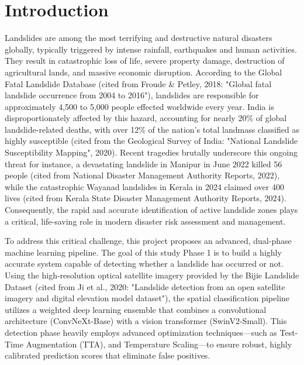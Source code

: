 \documentclass[11pt,a4paper]{article}
\begin{document}
\section{Introduction}
Landslides are among the most terrifying and destructive natural disasters globally, typically triggered by intense rainfall, earthquakes and human activities. They result in catastrophic loss of life, severe property damage, destruction of agricultural lands, and massive economic disruption. According to the Global Fatal Landslide Database (cited from Froude \& Petley, 2018: "Global fatal landslide occurrence from 2004 to 2016"), landslides are responsible for approximately 4,500 to 5,000 people effected worldwide every year. India is disproportionately affected by this hazard, accounting for nearly 20\% of global landslide-related deaths, with over 12\% of the nation's total landmass classified as highly susceptible (cited from the Geological Survey of India: "National Landslide Susceptibility Mapping", 2020). Recent tragedies brutally underscore this ongoing threat for instance, a devastating landslide in Manipur in June 2022 killed 56 people (cited from National Disaster Management Authority Reports, 2022), while the catastrophic Wayanad landslides in Kerala in 2024 claimed over 400 lives (cited from Kerala State Disaster Management Authority Reports, 2024). Consequently, the rapid and accurate identification of active landslide zones plays a critical, life-saving role in modern disaster risk assessment and management.

To address this critical challenge, this project proposes an advanced, dual-phase machine learning pipeline. The goal of this study Phase 1 is to build a highly accurate system capable of detecting whether a landslide has occurred or not. Using the high-resolution optical satellite imagery provided by the Bijie Landslide Dataset (cited from Ji et al., 2020: "Landslide detection from an open satellite imagery and digital elevation model dataset"), the spatial classification pipeline utilizes a weighted deep learning ensemble that combines a convolutional architecture (ConvNeXt-Base) with a vision transformer (SwinV2-Small). This detection phase heavily employs advanced optimization techniques—such as Test-Time Augmentation (TTA), and Temperature Scaling—to ensure robust, highly calibrated prediction scores that eliminate false positives.
\end{document}
